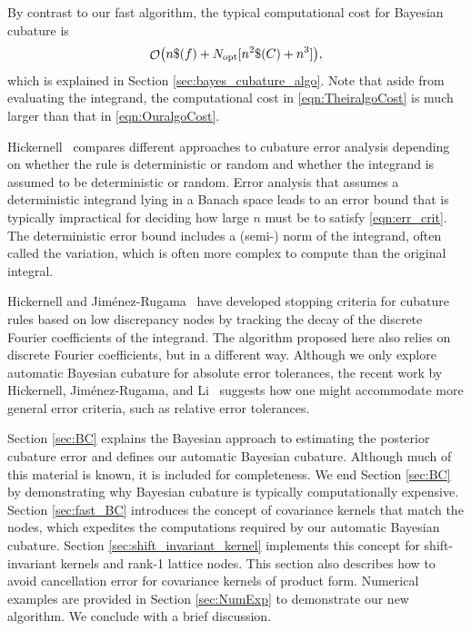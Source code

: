 \documentclass{svjour3}                     %
\DeclareMathOperator{\Order}{{\mathcal O}}
\newcommand{\opt}{{\textup{opt}}}
\begin{document}
By contrast to our fast algorithm, the typical computational cost for Bayesian cubature is
\begin{equation} \label{eqn:TheiralgoCost}
    \Order\bigl(n \$(f) + N_{\opt}[n^2\$(C) + n^3] \bigr),
\end{equation} 
which is explained in Section \ref{sec:bayes_cubature_algo}. Note that aside from evaluating the integrand, the computational cost in \eqref{eqn:TheiralgoCost} is much larger than that in \eqref{eqn:OuralgoCost}.  

Hickernell~\cite{Hic17a} compares different approaches to cubature error analysis depending on whether the rule is deterministic or random and whether the integrand is assumed to be deterministic or random.  Error analysis that assumes a deterministic integrand lying in a Banach space leads to an error bound that is typically impractical for deciding how large $n$ must be to satisfy \eqref{eqn:err_crit}.  The deterministic error bound includes a (semi-) norm of the integrand, often called the variation, which is often more complex to compute than the original integral.

Hickernell and Jim\'enez-Rugama~\cite{HicJim16a,JimHic16a} have developed stopping criteria for cubature rules based on low discrepancy nodes by tracking the decay of the discrete Fourier coefficients of the integrand.  The algorithm proposed here also relies on discrete Fourier coefficients, but in a different way.  Although we only explore automatic Bayesian cubature for absolute error tolerances, the recent work by Hickernell, Jim\'enez-Rugama, and Li~\cite{HicEtal17a} suggests how one might accommodate more general error criteria, such as relative error tolerances.

Section \ref{sec:BC} explains the Bayesian approach to estimating the posterior cubature error and defines our automatic Bayesian cubature. Although much of this material is known, it is included for completeness.  We end Section \ref{sec:BC}  by demonstrating why Bayesian cubature is typically computationally expensive.
Section \ref{sec:fast_BC}  introduces the concept of covariance kernels that match the nodes, which expedites the computations required by our automatic Bayesian cubature. 
Section \ref{sec:shift_invariant_kernel} implements this concept for shift-invariant kernels and rank-1 lattice nodes.  This section also describes how to avoid cancellation error for covariance kernels of product form.  Numerical examples are provided in Section \ref{sec:NumExp} to demonstrate our new algorithm.  We conclude with a brief discussion.
\end{document}
